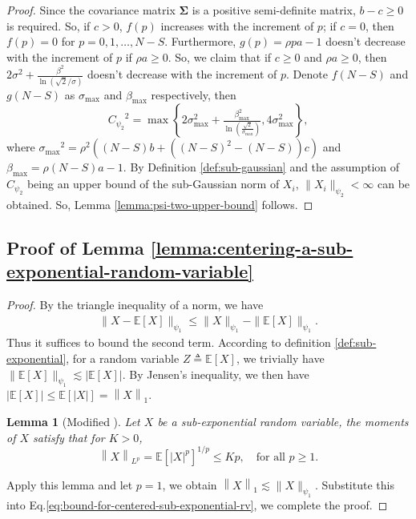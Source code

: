 \documentclass[lettersize,journal]{IEEEtran}
\newcommand{\norm}[1]{\left\lVert#1\right\rVert}
\newcommand{\Sigmaa}{\boldsymbol{\Sigma}}
\newcommand{\ex}[1]{\mathbb{E}\left[#1\right]}
\newcommand{\Cpsitwo}{C_{\psi_2}}
\newcommand{\psione}[1]{\|#1\|_{\psi_1} }
\newcommand{\psitwo}[1]{\|#1\|_{\psi_2} }
\newcommand{\sigmamax}{\sigma_{\max}}
\newcommand{\betamax}{\beta_{\max}}
\newtheorem{lemma}{Lemma}
\begin{document}
{\begin{proof}
  Since the covariance matrix $\Sigmaa$ is a positive semi-definite matrix, $b-c\geq 0$ is required. So, if $c>0$, $f(p)$ increases with the increment of $p$; if $c=0$, then $f(p)=0$ for $p = 0,1,\ldots,N-S$. Furthermore, $g(p) = \rho pa-1$ doesn't decrease with the increment of $p$ if $\rho a\geq 0$. So, we claim that if $c\geq 0$ and $\rho a\geq 0$, then $2\sigma^2 + \frac{\beta^2}{\ln{(\sqrt{2}/\sigma)}}$ doesn't decrease with the increment of $p$. Denote $f(N-S)$ and $g(N-S)$ as $\sigmamax$ and $\betamax$ respectively, then
     \begin{equation}
         {\Cpsitwo}^2 = \max\left\{2\sigmamax^2 + \tfrac{\betamax^2}{\ln{(\frac{\sqrt{2}}{\sigmamax})}}, 4\sigmamax^2 \right\},
     \end{equation}
     where ${\sigmamax}^2 = \rho^2((N-S)b+((N-S)^2-(N-S))c)$ and $\betamax = \rho(N-S)a-1$.
    By Definition \ref{def:sub-gaussian} and the assumption of $\Cpsitwo$ being an upper bound of the sub-Gaussian norm of $X_i$, $\psitwo{X_i}<\infty$ can be obtained. So, Lemma \ref{lemma:psi-two-upper-bound} follows.
\end{proof}

\subsection{Proof of Lemma \ref{lemma:centering-a-sub-exponential-random-variable}}
\begin{proof}
\label{proof of lemma:centering-a-sub-exponential-random-variable}
By the triangle inequality of a norm, we have
\begin{align}
\label{eq:bound-for-centered-sub-exponential-rv}
    \psione{X-\ex{X}}\leq \psione{X} - \psione{\ex{X}}.
\end{align}
Thus it suffices to bound the second term. According to definition \ref{def:sub-exponential}, for a random variable $Z \triangleq \ex{X}$, we trivially have $\psione{\ex{X}}\lesssim|\ex{X}|$. By Jensen’s inequality, we then have
     $|\ex{X}|\leq \ex{|X|} = \norm{X}_1.$
\begin{lemma}[Modified {\cite[proposition 2.7.1]{vershynin2020high}}] Let $X$ be a sub-exponential random variable, the moments of $X$ satisfy that for $K>0$,
\[
    \norm{X}_{L^{p}} = \ex{|X|^{p}} ^{1/p}\leq Kp,\quad\text{for all }p\geq1.
\]
\end{lemma}
Apply this lemma and let $p=1$, we obtain $\norm{X}_1\lesssim \psione{X}.$
Substitute this into Eq.\eqref{eq:bound-for-centered-sub-exponential-rv}, we complete the proof.
\end{proof}


}
\end{document}
